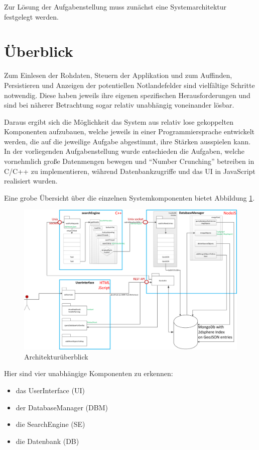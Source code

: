 \documentclass[10pt,a4paper]{report}
\begin{document}
Zur Lösung der Aufgabenstellung muss zunächst eine Systemarchitektur festgelegt werden.

\section{Überblick}
Zum Einlesen der Rohdaten, Steuern der Applikation und zum Auffinden, Persistieren und Anzeigen der potentiellen Notlandefelder sind vielfältige Schritte notwendig. Diese haben jeweils ihre eigenen spezifischen Herausforderungen und sind bei näherer Betrachtung sogar relativ unabhängig voneinander lösbar.

Daraus ergibt sich die Möglichkeit das System aus relativ lose gekoppelten Komponenten aufzubauen, welche jeweils in einer Programmiersprache ent\-wickelt werden, die auf die jeweilige Aufgabe abgestimmt, ihre Stärken ausspielen kann. In der vorliegenden Aufgabenstellung wurde entschieden die Aufgaben, welche vornehmlich große Datenmengen bewegen und "`Number Crunching"' betreiben in C/C++ zu implementieren, während Datenbankzugriffe und das UI in JavaScript realisiert wurden.

Eine grobe Übersicht über die einzelnen Systemkomponenten bietet Abbildung \ref{architektur}.

\begin{figure}[h]
	\includegraphics[width=\textwidth]{../Architektur/Architektur.png}
	\caption{Architekturüberblick} \label{architektur}
\end{figure}

Hier sind vier unabhängige Komponenten zu erkennen:
\begin{itemize}
	\item das UserInterface (UI)
	\item der DatabaseManager (DBM)
	\item die SearchEngine (SE)
	\item die Datenbank (DB)
\end{itemize}
\end{document}
